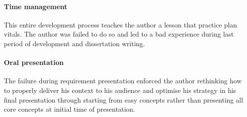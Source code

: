 \paragraph{Time management}
This entire development process teaches the author a lesson that practice
plan vitals. The author was failed to do so and led to a bad experience during
last period of development and dissertation writing.

\paragraph{Oral presentation}
The failure during requirement presentation enforced the author rethinking how to
properly deliver his context to his audience and optimise his strategy in his final
presentation through starting from easy concepts rather than presenting all core concepts at initial time of presentation.
